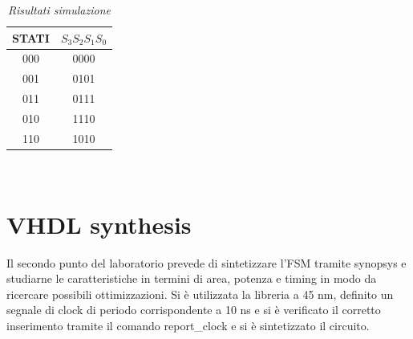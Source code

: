 \begin{table}[!h]\footnotesize
	\centering
	\begin{tabular}{|c|c|}
		\hline
		\textbf{STATI} & \textbf{$S_{3}S_{2}S_{1}S_{0}$}\\
		\hline
		000 & 0000\\
		\hline
		001 &0101 \\
		\hline
		011& 0111\\
		\hline
		010& 1110\\
		\hline
		110& 1010\\
		\hline 
	\end{tabular}
	\caption{\textit{Risultati simulazione}}
	\label{tab2}
\end{table} \\


\section{VHDL synthesis}
Il secondo punto del laboratorio prevede di sintetizzare l’FSM tramite synopsys e studiarne le caratteristiche in termini di area, potenza e timing in modo da ricercare possibili ottimizzazioni. Si è utilizzata la libreria a 45 nm, definito un segnale di clock di periodo corrispondente a 10 ns e si è verificato il corretto inserimento tramite il comando report_clock e si è sintetizzato il circuito.

